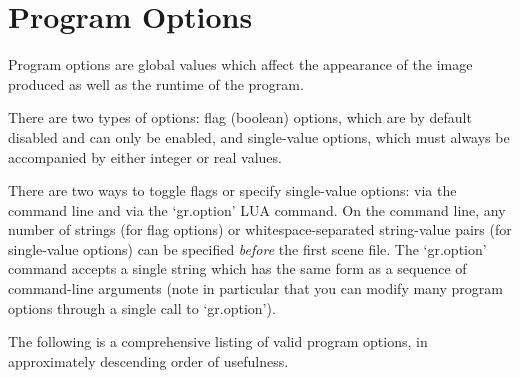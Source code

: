 \documentclass{article}
\begin{document}
\section{Program Options}

Program options are global values which affect the appearance of the image
produced as well as the runtime of the program.

There are two types of options: flag (boolean) options, which are by default
disabled and can only be enabled, and single-value options, which must always be
accompanied by either integer or real values.

There are two ways to toggle flags or specify single-value options: via the
command line and via the `gr.option' LUA command. On the command line, any
number of strings (for flag options) or whitespace-separated string-value pairs
(for single-value options) can be specified \emph{before} the first scene file.
The `gr.option' command accepts a single string which has the same form as a
sequence of command-line arguments (note in particular that you can modify many
program options through a single call to `gr.option').

The following is a comprehensive listing of valid program options, in
approximately descending order of usefulness.
\end{document}
